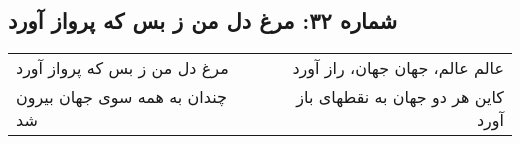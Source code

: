 \begin{center}
\section*{شماره ۳۲: مرغ دل من ز بس که پرواز آورد}
\label{sec:032}
\begin{longtable}{l p{0.5cm} r}
مرغ دل من ز بس که پرواز آورد
&&
عالم عالم، جهان جهان، راز آورد
\\
چندان به همه سوی جهان بیرون شد
&&
کاین هر دو جهان به نقطهای باز آورد
\\
\end{longtable}
\end{center}
